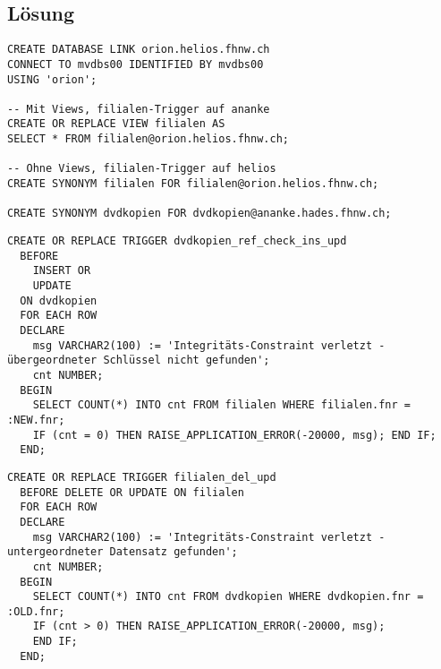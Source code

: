 \documentclass[a4paper,10pt,titlepage=false]{scrreprt}
\begin{document}
\begin{itemize}
\subsection{Lösung}
\begin{lstlisting}[style=sql, title=Link ananke <=> helios]
CREATE DATABASE LINK orion.helios.fhnw.ch
CONNECT TO mvdbs00 IDENTIFIED BY mvdbs00
USING 'orion';

-- Mit Views, filialen-Trigger auf ananke
CREATE OR REPLACE VIEW filialen AS
SELECT * FROM filialen@orion.helios.fhnw.ch;

-- Ohne Views, filialen-Trigger auf helios
CREATE SYNONYM filialen FOR filialen@orion.helios.fhnw.ch;

CREATE SYNONYM dvdkopien FOR dvdkopien@ananke.hades.fhnw.ch;
\end{lstlisting}
\begin{lstlisting}[style=sql, title=FILIALEN-Trigger auf ananke]
CREATE OR REPLACE TRIGGER dvdkopien_ref_check_ins_upd
  BEFORE
    INSERT OR
    UPDATE
  ON dvdkopien
  FOR EACH ROW
  DECLARE
    msg VARCHAR2(100) := 'Integritäts-Constraint verletzt - übergeordneter Schlüssel nicht gefunden';
    cnt NUMBER;
  BEGIN
    SELECT COUNT(*) INTO cnt FROM filialen WHERE filialen.fnr = :NEW.fnr;
    IF (cnt = 0) THEN RAISE_APPLICATION_ERROR(-20000, msg); END IF;
  END;
\end{lstlisting}
\begin{lstlisting}[style=sql, title=DVDKOPIEN-Trigger auf helios]
CREATE OR REPLACE TRIGGER filialen_del_upd
  BEFORE DELETE OR UPDATE ON filialen
  FOR EACH ROW
  DECLARE 
    msg VARCHAR2(100) := 'Integritäts-Constraint verletzt - untergeordneter Datensatz gefunden';
    cnt NUMBER;
  BEGIN
    SELECT COUNT(*) INTO cnt FROM dvdkopien WHERE dvdkopien.fnr = :OLD.fnr;
    IF (cnt > 0) THEN RAISE_APPLICATION_ERROR(-20000, msg);
    END IF;
  END;
\end{lstlisting}

\end{itemize}
\end{document}
